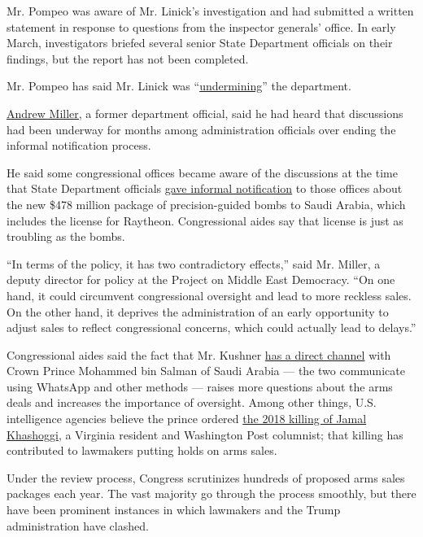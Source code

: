 Mr. Pompeo was aware of Mr. Linick's investigation and had submitted a
written statement in response to questions from the inspector generals'
office. In early March, investigators briefed several senior State
Department officials on their findings, but the report has not been
completed.

Mr. Pompeo has said Mr. Linick was
``\href{https://www.nytimes.com/2020/05/18/us/politics/pompeo-trump-linick-inspector-general-firing.html}{undermining}''
the department.

\href{https://pomed.org/team/andrew-miller/}{Andrew Miller,} a former
department official, said he had heard that discussions had been
underway for months among administration officials over ending the
informal notification process.

He said some congressional offices became aware of the discussions at
the time that State Department officials
\href{https://www.nytimes.com/2020/05/28/us/politics/congress-saudi-arabia-arms-sales.html}{gave
informal notification} to those offices about the new \$478 million
package of precision-guided bombs to Saudi Arabia, which includes the
license for Raytheon. Congressional aides say that license is just as
troubling as the bombs.

``In terms of the policy, it has two contradictory effects,'' said Mr.
Miller, a deputy director for policy at the Project on Middle East
Democracy. ``On one hand, it could circumvent congressional oversight
and lead to more reckless sales. On the other hand, it deprives the
administration of an early opportunity to adjust sales to reflect
congressional concerns, which could actually lead to delays.''

Congressional aides said the fact that Mr. Kushner
\href{https://www.nytimes.com/2018/12/08/world/middleeast/saudi-mbs-jared-kushner.html}{has
a direct channel} with Crown Prince Mohammed bin Salman of Saudi Arabia
--- the two communicate using WhatsApp and other methods --- raises more
questions about the arms deals and increases the importance of
oversight. Among other things, U.S. intelligence agencies believe the
prince ordered
\href{https://www.nytimes.com/2019/06/19/world/middleeast/jamal-khashoggi-Mohammed-bin-Salman.html}{the
2018 killing of Jamal Khashoggi}, a Virginia resident and Washington
Post columnist; that killing has contributed to lawmakers putting holds
on arms sales.

Under the review process, Congress scrutinizes hundreds of proposed arms
sales packages each year. The vast majority go through the process
smoothly, but there have been prominent instances in which lawmakers and
the Trump administration have clashed.

